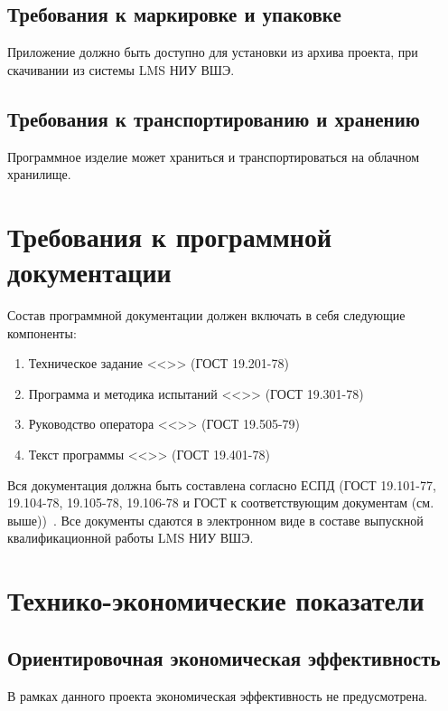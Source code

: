 \documentclass[a4paper,12pt,reqno]{article}
\begin{document}
    \subsection{Требования к маркировке и упаковке}
    Приложение должно быть доступно для установки из архива проекта, при скачивании из системы LMS НИУ ВШЭ.

    \subsection{Требования к транспортированию и хранению}
    Программное изделие может храниться и транспортироваться на облачном хранилище.
    \newpage


    \section{Требования к программной документации}
    Состав программной документации должен включать в себя следующие компоненты:
    \begin{enumerate}
        \item Техническое задание <<\unskip>> (ГОСТ 19.201-78) \label{tz}
        \item Программа и методика испытаний <<\unskip>> (ГОСТ 19.301-78) \label{pmi}
        \item Руководство оператора <<\unskip>> (ГОСТ 19.505-79) \label{ro}
        \item Текст программы <<\unskip>> (ГОСТ 19.401-78) \label{tp}
    \end{enumerate}

    \indent
    Вся документация должна быть составлена согласно ЕСПД (ГОСТ 19.101-77, 19.104-78, 19.105-78, 19.106-78 и ГОСТ к соответствующим документам (см. выше))~\cite{TZ:gost0, TZ:gost1, TZ:gost2, TZ:gost3, TZ:gost4, TZ:gost5, TZ:gost6, TZ:gost7, TZ:gost8, TZ:gost9, TZ:gost10, TZ:gost11}. Все документы сдаются в электронном виде в составе выпускной квалификационной работы LMS НИУ ВШЭ.
    \newpage


    \section{Технико-экономические показатели}

    \subsection{Ориентировочная экономическая эффективность}
    В рамках данного проекта экономическая эффективность не предусмотрена.
\end{document}
